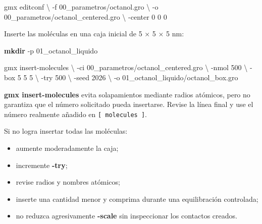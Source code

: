\documentclass[
  spanish,
  11pt,
  a4paper]{article}
\newenvironment{Shaded}{\begin{snugshade}}{\end{snugshade}}
\newcommand{\AttributeTok}[1]{\textcolor[rgb]{0.13,0.29,0.53}{#1}}
\newcommand{\DataTypeTok}[1]{\textcolor[rgb]{0.13,0.29,0.53}{#1}}
\newcommand{\ExtensionTok}[1]{#1}
\newcommand{\FunctionTok}[1]{\textcolor[rgb]{0.13,0.29,0.53}{\textbf{#1}}}
\newcommand{\NormalTok}[1]{#1}
\providecommand{\tightlist}{%
  \setlength{\itemsep}{0pt}\setlength{\parskip}{0pt}}
\begin{document}
\begin{Shaded}
\begin{Highlighting}[]
\ExtensionTok{gmx}\NormalTok{ editconf }\DataTypeTok{\textbackslash{}}
    \AttributeTok{{-}f}\NormalTok{ 00\_parametros/octanol.gro }\DataTypeTok{\textbackslash{}}
    \AttributeTok{{-}o}\NormalTok{ 00\_parametros/octanol\_centered.gro }\DataTypeTok{\textbackslash{}}
    \AttributeTok{{-}center}\NormalTok{ 0 0 0}
\end{Highlighting}
\end{Shaded}

Inserte las moléculas en una caja inicial de 5 × 5 × 5 nm:

\begin{Shaded}
\begin{Highlighting}[]
\FunctionTok{mkdir} \AttributeTok{{-}p}\NormalTok{ 01\_octanol\_liquido}

\ExtensionTok{gmx}\NormalTok{ insert{-}molecules }\DataTypeTok{\textbackslash{}}
    \AttributeTok{{-}ci}\NormalTok{ 00\_parametros/octanol\_centered.gro }\DataTypeTok{\textbackslash{}}
    \AttributeTok{{-}nmol}\NormalTok{ 500 }\DataTypeTok{\textbackslash{}}
    \AttributeTok{{-}box}\NormalTok{ 5 5 5 }\DataTypeTok{\textbackslash{}}
    \AttributeTok{{-}try}\NormalTok{ 500 }\DataTypeTok{\textbackslash{}}
    \AttributeTok{{-}seed}\NormalTok{ 2026 }\DataTypeTok{\textbackslash{}}
    \AttributeTok{{-}o}\NormalTok{ 01\_octanol\_liquido/octanol\_box.gro}
\end{Highlighting}
\end{Shaded}

\textbf{gmx insert-molecules} evita solapamientos mediante radios
atómicos, pero no garantiza que el número solicitado pueda insertarse.
Revise la línea final y use el número realmente añadido en
\texttt{{[}\ molecules\ {]}}.

Si no logra insertar todas las moléculas:

\begin{itemize}
\tightlist
\item
  aumente moderadamente la caja;
\item
  incremente \textbf{-try};
\item
  revise radios y nombres atómicos;
\item
  inserte una cantidad menor y comprima durante una equilibración
  controlada;
\item
  no reduzca agresivamente \textbf{-scale} sin inspeccionar los
  contactos creados.
\end{itemize}
\end{document}
